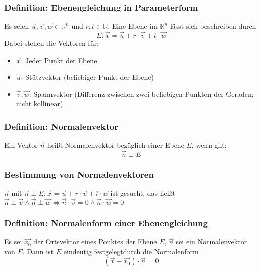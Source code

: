 \documentclass{article}
\begin{document}
  \subsubsection{Definition: Ebenengleichung in Parameterform}
  Es seien $\vec{u}, \vec{v}, \vec{w} \in \mathbb{R}^n$ und $r, t \in \mathbb{R}$. Eine Ebene im $\mathbb{R}^n$ lässt sich beschreiben durch 
  \begin{equation*}
  	E : \vec{x} = \vec{u} + r \cdot \vec{v} + t \cdot \vec{w}
  \end{equation*}
  Dabei stehen die Vektoren für: 
  \begin{itemize}
  	\item $\vec{x}$: Jeder Punkt der Ebene
  	\item $\vec{u}$: Stützvektor (beliebiger Punkt der Ebene)
  	\item $\vec{v}, \vec{w}$: Spannvektor (Differenz zwischen zwei beliebigen Punkten der Geraden; nicht kollinear)
  \end{itemize}
  
  \subsubsection{Definition: Normalenvektor}
  Ein Vektor $\vec{n}$ heißt Normalenvektor bezüglich einer Ebene $E$, wenn gilt: 
  \begin{equation*}
  	\vec{n} \perp E
  \end{equation*}
  
  \subsubsection{Bestimmung von Normalenvektoren}
  $\vec{n}$ mit $\vec{n} \perp E : \vec{x} = \vec{u} + r \cdot \vec{v} + t \cdot \vec{w}$ ist gesucht, das heißt $\vec{n} \perp \vec{v} \land \vec{n} \perp \vec{w} \Leftrightarrow \vec{n} \cdot \vec{v} = 0 \land \vec{n} \cdot \vec{w} = 0$
  
  \subsubsection{Definition: Normalenform einer Ebenengleichung}
  Es sei $\vec{x_0}$ der Ortsvektor eines Ponktes der Ebene $E$, $\vec{n}$ sei ein Normalenvektor von $E$. Dann ist $E$ eindeutig festgelegtdurch die Normalenform
  \begin{equation*}
  	(\vec{x} - \vec{x_0}) \cdot \vec{n} = 0
  \end{equation*}
  
\end{document}
